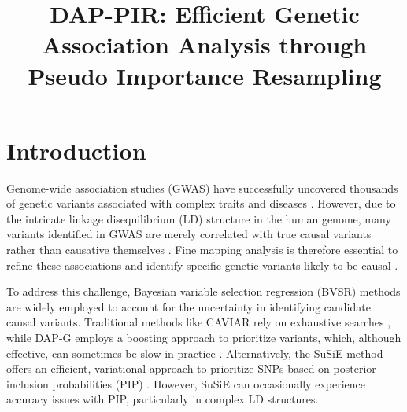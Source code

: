 \documentclass[pdflatex,sn-mathphys-num]{sn-jnl}%
\theoremstyle{thmstyleone}%
\theoremstyle{thmstyletwo}%
\theoremstyle{thmstylethree}%
\begin{document}
\title[Article Title]{DAP-PIR: Efficient Genetic Association Analysis through Pseudo Importance Resampling}

\author[1]{ }

\author*[1]{ }





\maketitle



\section{Introduction}\label{sec1}
Genome-wide association studies (GWAS) have successfully uncovered thousands of genetic variants associated with complex traits and diseases \cite{visscher201710}. However, due to the intricate linkage disequilibrium (LD) structure in the human genome, many variants identified in GWAS are merely correlated with true causal variants rather than causative themselves \cite{ardlie2002patterns}. Fine mapping analysis is therefore essential to refine these associations and identify specific genetic variants likely to be causal \cite{spain2015strategies, schaid2018genome}.

To address this challenge, Bayesian variable selection regression (BVSR) methods are widely employed to account for the uncertainty in identifying candidate causal variants. Traditional methods like CAVIAR rely on exhaustive searches \cite{hormozdiari2014identifying}, while DAP-G employs a boosting approach to prioritize variants, which, although effective, can sometimes be slow in practice \cite{wen2016efficient, lee2018bayesian}. Alternatively, the SuSiE method offers an efficient, variational approach to prioritize SNPs based on posterior inclusion probabilities (PIP) \cite{wang2020simple}. However, SuSiE can occasionally experience accuracy issues with PIP, particularly in complex LD structures.
\end{document}

